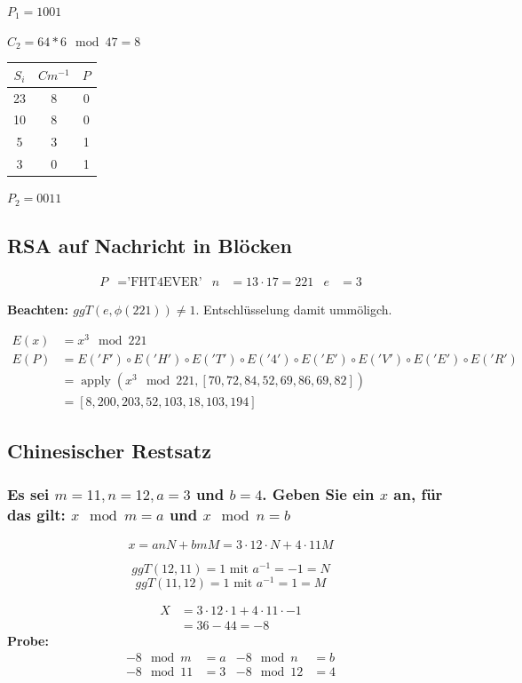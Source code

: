 $P_1 = 1001$

$C_2= 64 * 6 \mod 47 = 8$


\begin{tabular}{ccc}
 $S_i$ & $Cm^{-1}$ & $P$ \\ \hline
 23    & 8  & 0  \\
 10    & 8  & 0  \\
 5     & 3  & 1  \\
 3     & 0   & 1  
\end{tabular}

$P_2 = 0011$

\subsection{RSA auf Nachricht in Blöcken}
\begin{align}
  P &= \text{'FHT4EVER'}  &
  n &= 13 \cdot 17 = 221 & e &= 3
\end{align}


\textbf{Beachten: $ggT(e, \phi(221) ) \ne 1$}. Entschlüsselung damit ummöligch.

\begin{align}
	E(x) &=  x^3 \mod 221 \\
	E(P) &=  E('F') \circ E('H')\circ E('T')\circ E('4')\circ E('E')\circ E('V')\circ E('E')\circ E('R')\\
		 &=  \operatorname{apply}(x^3 \mod 221 ,[70, 72, 84, 52, 69, 86, 69, 82])    \\
		 &=  [8, 200, 203, 52, 103, 18, 103, 194]
\end{align}



\subsection{Chinesischer Restsatz}
\subsubsection{Es sei $m = 11, n = 12, a = 3$ und $b = 4$. Geben Sie ein $x$ an, für das gilt: $x \mod m = a$ und $ x \mod n = b$}

\begin{equation}
	x = a n N + b m M  = 3 \cdot 12 \cdot N + 4 \cdot 11 M
\end{equation}

$$ggT(12, 11) = 1 \text{ mit } a^{-1} = -1 = N$$
$$ggT(11, 12) = 1 \text{ mit } a^{-1} =  1 = M$$

\begin{align}
	X &= 3 \cdot 12 \cdot 1 + 4 \cdot 11 \cdot -1 \\
	  &=  36 - 44 = -8
\end{align}
\textbf{Probe:}
\begin{align}
	-8 \mod  m &= a  & -8 \mod  n &= b \\
	-8 \mod 11 &= 3  & -8 \mod 12 &= 4 \\
\end{align}

